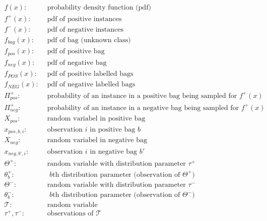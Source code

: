 \begin{align*}
  f(x) : & \text{ probability density function (pdf)} \\
  f^+(x) : & \text{ pdf of positive instances} \\
  f^-(x) : & \text{ pdf of negative instances} \\
  f_{bag}(x) : & \text{ pdf of bag (unknown class)} \\
  f_{pos}(x) : & \text{ pdf of positive bag} \\
  f_{neg}(x) : & \text{ pdf of negative bag} \\
  f_{POS} (x) : & \text{ pdf of positive labelled bags} \\
  f_{NEG} (x) : & \text{ pdf of negative labelled bags} \\
  \Pi_{pos}^+ : & \text{ probability of an instance in a positive bag being sampled for } f^+(x)\\
  \Pi_{neg}^+ : & \text{ probability of an instance in a negative bag being sampled for } f^+(x) \\
  X_{pos} : & \text{ random variabel in positive bag} \\
  x_{pos,b,i} : & \text{ observation $i$ in positive bag $b$} \\
  X_{neg} : & \text{ random variabel in negative bag} \\
  x_{neg,{b'},i} : & \text{ observation $i$ in negative bag $b'$} \\
  \Theta^+ : & \text{ random variable with distribution parameter } \tau^+ \\
  \theta_b^+ : & \text{ $b$th distribution parameter (observation of $\Theta^+$)} \\
  \Theta^- : & \text{ random variable with distribution parameter $\tau^-$} \\
  \theta_b^- : & \text{ $b$th distribution parameter (observation of $\Theta^-$)} \\
  \mathcal{T} : & \text{ random variable} \\
  \tau^+, \tau^- : & \text{ observations of $\mathcal{T}$} \\
\end{align*}
 